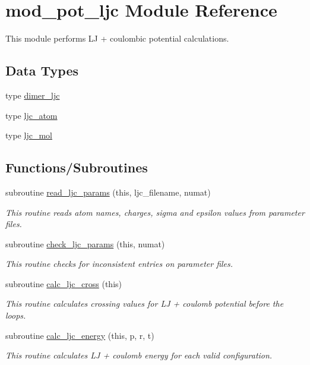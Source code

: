 \hypertarget{namespacemod__pot__ljc}{}\section{mod\+\_\+pot\+\_\+ljc Module Reference}
\label{namespacemod__pot__ljc}


This module performs LJ + coulombic potential calculations.  


\subsection*{Data Types}
\begin{DoxyCompactItemize}
\item 
type \hyperlink{structmod__pot__ljc_1_1dimer__ljc}{dimer\+\_\+ljc}
\item 
type \hyperlink{structmod__pot__ljc_1_1ljc__atom}{ljc\+\_\+atom}
\item 
type \hyperlink{structmod__pot__ljc_1_1ljc__mol}{ljc\+\_\+mol}
\end{DoxyCompactItemize}
\subsection*{Functions/\+Subroutines}
\begin{DoxyCompactItemize}
\item 
subroutine \hyperlink{namespacemod__pot__ljc_aba75dd17c928cdddf564bf03d18b3ee2}{read\+\_\+ljc\+\_\+params} (this, ljc\+\_\+filename, numat)
\begin{DoxyCompactList}\small\item\em This routine reads atom names, charges, sigma and epsilon values from parameter files. \end{DoxyCompactList}\item 
subroutine \hyperlink{namespacemod__pot__ljc_ae251ed7b35f9a6401200390d8684ea46}{check\+\_\+ljc\+\_\+params} (this, numat)
\begin{DoxyCompactList}\small\item\em This routine checks for inconsistent entries on parameter files. \end{DoxyCompactList}\item 
subroutine \hyperlink{namespacemod__pot__ljc_aea69edf70ec804ebb8075741c84ab50b}{calc\+\_\+ljc\+\_\+cross} (this)
\begin{DoxyCompactList}\small\item\em This routine calculates crossing values for LJ + coulomb potential before the loops. \end{DoxyCompactList}\item 
subroutine \hyperlink{namespacemod__pot__ljc_a13c36fde6ac0af7265630bc8105c23b6}{calc\+\_\+ljc\+\_\+energy} (this, p, r, t)
\begin{DoxyCompactList}\small\item\em This routine calculates LJ + coulomb energy for each valid configuration. \end{DoxyCompactList}\end{DoxyCompactItemize}
